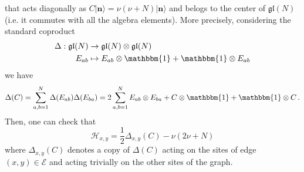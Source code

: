 \documentclass[10pt]{article}
\numberwithin{equation}{section}
\numberwithin{equation}{subsection}
\newcommand{\twoj}{\nu}
\begin{document}
that acts diagonally as $C|\bm{n}\rangle=\twoj(\twoj+N)|\bm{n}\rangle$ and belogs to the center of $\mathfrak{gl}(N)$ (i.e. it commutes with all the algebra elements).  
More precisely,  considering the standard coproduct 
\begin{equation}
\begin{split}
\Delta:\mathfrak{gl}(N)&\to \mathfrak{gl}(N)\otimes \mathfrak{gl}(N)\\
E_{ab}&\mapsto E_{ab}\otimes \mathbbm{1}+\mathbbm{1}\otimes E_{ab}
\end{split}
\end{equation}
we have 
\begin{equation}
\Delta(C)=\sum_{a,b=1}^{N}\Delta(E_{ab})\Delta(E_{ba})=2\sum_{a,b=1}^{N}E_{ab}\otimes E_{ba}+C\otimes \mathbbm{1}+\mathbbm{1}\otimes C\,.
\end{equation}
Then, one can check that 
\begin{equation}\label{hamiltonianCasimir}
	\mathcal{H}_{x,y}=\frac{1}{2}\Delta_{x,y}(C)-\twoj(2\twoj+N)
\end{equation}
where $\Delta_{x,y}(C)$ denotes a copy of $\Delta(C)$ acting on  the sites of edge $(x,y)\in \mathcal{E}$ and acting trivially on the other sites of the graph.
\end{document}
